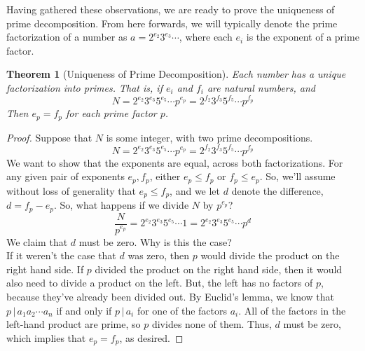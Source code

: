 \documentclass{article}
\newtheorem{theorem}{Theorem}
\newcommand{\divv}{\,|\,}
\begin{document}
Having gathered these observations, we are ready to prove the uniqueness of prime decomposition. From here forwards, we will typically denote the prime factorization of a number as $a = 2^{e_2}3^{e_3}\cdots$, where each $e_i$ is the exponent of a prime factor.  
\begin{mdframed} 
\begin{theorem}[Uniqueness of Prime Decomposition] 
Each number has a unique factorization into primes. That is, if $e_i$ and $f_i$ are natural numbers, and 
\[ N = 2^{e_2}3^{e_3}5^{e_5}\cdots p^{e_p} = 2^{f_2}3^{f_3}5^{f_5}\cdots p^{f_p}\]
Then $e_p = f_p$ for each prime factor $p$.
\end{theorem} 
\begin{proof} 
Suppose that $N$ is some integer, with two prime decompositions. 
\[N = 2^{e_2}3^{e_3}5^{e_5}\cdots p^{e_p} = 2^{f_2}3^{f_3}5^{f_5}\cdots p^{f_p}\]
We want to show that the exponents are equal, across both factorizations. For any given pair of exponents $e_p, f_p$, either $e_p \leq f_p$ or $f_p \leq e_p$. So, we'll assume without loss of generality that $e_p \leq f_p$, and we let $d$ denote the difference, $d = f_p - e_p$. So, what happens if we divide $N$ by $p^{e_p}$? 
\[\frac{N}{p^{e_p}} = 2^{e_2}3^{e_3}5^{e_5}\cdots 1 = 2^{e_2}3^{e_3}5^{e_5}\cdots p^{d}\]
We claim that $d$ must be zero. Why is this the case? \\
If it weren't the case that $d$ was zero, then $p$ would divide the product on the right hand side. If $p$ divided the product on the right hand side, then it would also need to divide a product on the left. But, the left has no factors of $p$, because they've already been divided out. By Euclid's lemma, we know that $p\divv a_1a_2\cdots a_n$ if and only if $p\divv a_i$ for one of the factors $a_i$. All of the factors in the left-hand product are prime, so $p$ divides none of them. Thus, $d$ must be zero, which implies that $e_p = f_p$, as desired. 
\end{proof} 
\end{mdframed} 
 
\end{document}
